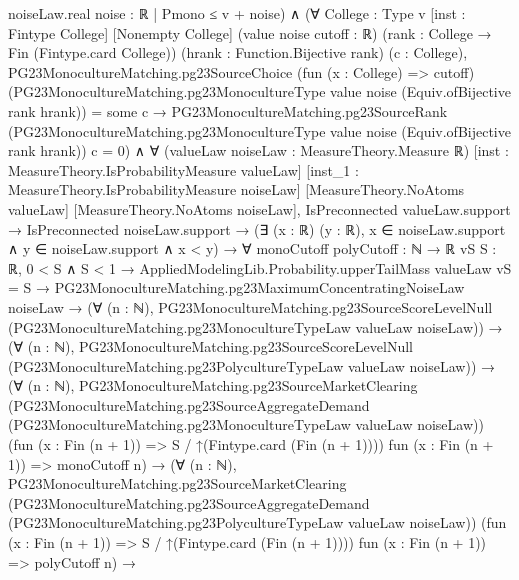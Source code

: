 \documentclass[10pt]{article}
\begin{document}
\begin{ReviewVerbatim}
                                noiseLaw.real {noise : ℝ | Pmono ≤ v + noise}) ∧
  (∀ {College : Type v} [inst : Fintype College] [Nonempty College] (value noise cutoff : ℝ)
      (rank : College → Fin (Fintype.card College)) (hrank : Function.Bijective rank) (c : College),
      PG23MonocultureMatching.pg23SourceChoice (fun (x : College) => cutoff)
            (PG23MonocultureMatching.pg23MonocultureType value noise (Equiv.ofBijective rank hrank)) =
          some c →
        PG23MonocultureMatching.pg23SourceRank
            (PG23MonocultureMatching.pg23MonocultureType value noise (Equiv.ofBijective rank hrank)) c =
          0) ∧
    ∀ (valueLaw noiseLaw : MeasureTheory.Measure ℝ) [inst : MeasureTheory.IsProbabilityMeasure valueLaw]
      [inst_1 : MeasureTheory.IsProbabilityMeasure noiseLaw] [MeasureTheory.NoAtoms valueLaw]
      [MeasureTheory.NoAtoms noiseLaw],
      IsPreconnected valueLaw.support →
        IsPreconnected noiseLaw.support →
          (∃ (x : ℝ) (y : ℝ), x ∈ noiseLaw.support ∧ y ∈ noiseLaw.support ∧ x < y) →
            ∀ {monoCutoff polyCutoff : ℕ → ℝ} {vS S : ℝ},
              0 < S ∧ S < 1 →
                AppliedModelingLib.Probability.upperTailMass valueLaw vS = S →
                  PG23MonocultureMatching.pg23MaximumConcentratingNoiseLaw noiseLaw →
                    (∀ (n : ℕ),
                        PG23MonocultureMatching.pg23SourceScoreLevelNull
                          (PG23MonocultureMatching.pg23MonocultureTypeLaw valueLaw noiseLaw)) →
                      (∀ (n : ℕ),
                          PG23MonocultureMatching.pg23SourceScoreLevelNull
                            (PG23MonocultureMatching.pg23PolycultureTypeLaw valueLaw noiseLaw)) →
                        (∀ (n : ℕ),
                            PG23MonocultureMatching.pg23SourceMarketClearing
                              (PG23MonocultureMatching.pg23SourceAggregateDemand
                                (PG23MonocultureMatching.pg23MonocultureTypeLaw valueLaw noiseLaw))
                              (fun (x : Fin (n + 1)) => S / ↑(Fintype.card (Fin (n + 1)))) fun (x : Fin (n + 1)) =>
                              monoCutoff n) →
                          (∀ (n : ℕ),
                              PG23MonocultureMatching.pg23SourceMarketClearing
                                (PG23MonocultureMatching.pg23SourceAggregateDemand
                                  (PG23MonocultureMatching.pg23PolycultureTypeLaw valueLaw noiseLaw))
                                (fun (x : Fin (n + 1)) => S / ↑(Fintype.card (Fin (n + 1)))) fun (x : Fin (n + 1)) =>
                                polyCutoff n) →

\end{ReviewVerbatim}
\end{document}
